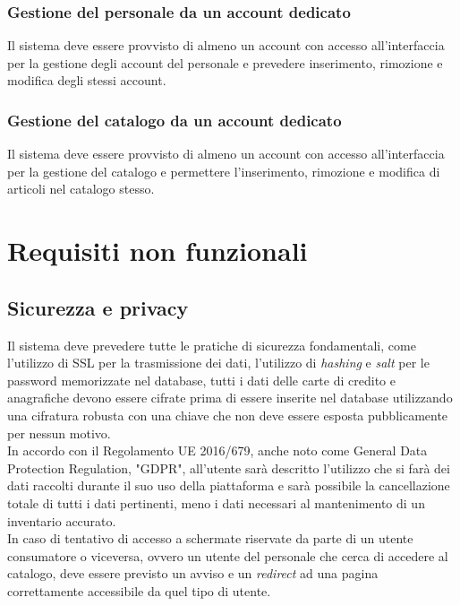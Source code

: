 \documentclass[12pt,a4paper]{article}
\begin{document}
\subsubsection{Gestione del personale da un account dedicato}
Il sistema deve essere provvisto di almeno un account con accesso all'interfaccia per la gestione degli account del personale e prevedere inserimento, rimozione e modifica degli stessi account.

\subsubsection{Gestione del catalogo da un account dedicato}
Il sistema deve essere provvisto di almeno un account con accesso all'interfaccia per la gestione del catalogo e permettere l'inserimento, rimozione e modifica di articoli nel catalogo stesso.

\section{Requisiti non funzionali}
\subsection{Sicurezza e privacy}
\label{sec:security}
Il sistema deve prevedere tutte le pratiche di sicurezza fondamentali, come l'utilizzo di SSL per la trasmissione dei dati, l'utilizzo di \textit{hashing} e \textit{salt} per le password memorizzate nel database, tutti i dati delle carte di credito e anagrafiche devono essere cifrate prima di essere inserite nel database utilizzando una cifratura robusta con una chiave che non deve essere esposta pubblicamente per nessun motivo. \\
In accordo con il Regolamento UE 2016/679, anche noto come General Data Protection Regulation, "GDPR", all'utente sarà descritto l'utilizzo che si farà dei dati raccolti durante il suo uso della piattaforma e sarà possibile la cancellazione totale di tutti i dati pertinenti, meno i dati necessari al mantenimento di un inventario accurato. \\
In caso di tentativo di accesso a schermate riservate da parte di un utente consumatore o viceversa, ovvero un utente del personale che cerca di accedere al catalogo, deve essere previsto un avviso e un \textit{redirect} ad una pagina correttamente accessibile da quel tipo di utente.

\end{document}
